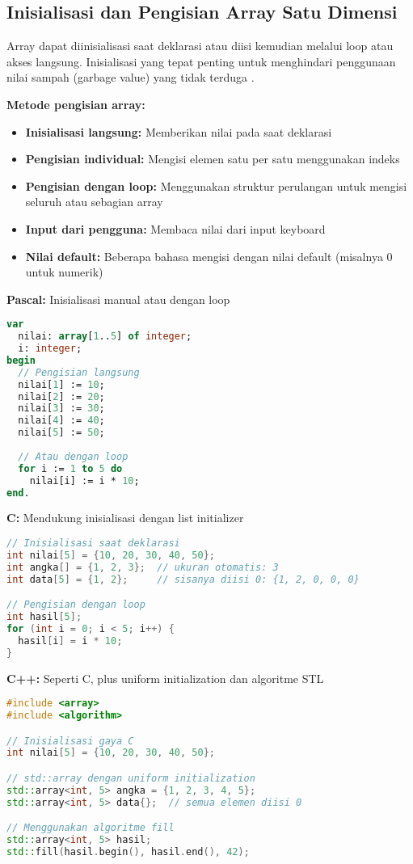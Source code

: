 \documentclass[../main.tex]{subfiles}
\begin{document}
\subsection{Inisialisasi dan Pengisian Array Satu Dimensi}
Array dapat diinisialisasi saat deklarasi atau diisi kemudian melalui loop atau akses langsung. Inisialisasi yang tepat penting untuk menghindari penggunaan nilai sampah (garbage value) yang tidak terduga \parencite{geeksforgeeks-array-init,learncpp-arrays,tambahpinter-array}.

\textbf{Metode pengisian array:}
\begin{itemize}
  \item \textbf{Inisialisasi langsung:} Memberikan nilai pada saat deklarasi
  \item \textbf{Pengisian individual:} Mengisi elemen satu per satu menggunakan indeks
  \item \textbf{Pengisian dengan loop:} Menggunakan struktur perulangan untuk mengisi seluruh atau sebagian array
  \item \textbf{Input dari pengguna:} Membaca nilai dari input keyboard
  \item \textbf{Nilai default:} Beberapa bahasa mengisi dengan nilai default (misalnya 0 untuk numerik)
\end{itemize}

\textbf{Pascal:} Inisialisasi manual atau dengan loop
\begin{lstlisting}[language=Pascal, caption={Inisialisasi array di Pascal}]
var
  nilai: array[1..5] of integer;
  i: integer;
begin
  // Pengisian langsung
  nilai[1] := 10;
  nilai[2] := 20;
  nilai[3] := 30;
  nilai[4] := 40;
  nilai[5] := 50;
  
  // Atau dengan loop
  for i := 1 to 5 do
    nilai[i] := i * 10;
end.
\end{lstlisting}

\textbf{C:} Mendukung inisialisasi dengan list initializer
\begin{lstlisting}[language=C, caption={Inisialisasi array di C}]
// Inisialisasi saat deklarasi
int nilai[5] = {10, 20, 30, 40, 50};
int angka[] = {1, 2, 3};  // ukuran otomatis: 3
int data[5] = {1, 2};     // sisanya diisi 0: {1, 2, 0, 0, 0}

// Pengisian dengan loop
int hasil[5];
for (int i = 0; i < 5; i++) {
  hasil[i] = i * 10;
}
\end{lstlisting}

\textbf{C++:} Seperti C, plus uniform initialization dan algoritme STL
\begin{lstlisting}[language=C++, caption={Inisialisasi array di C++}]
#include <array>
#include <algorithm>

// Inisialisasi gaya C
int nilai[5] = {10, 20, 30, 40, 50};

// std::array dengan uniform initialization
std::array<int, 5> angka = {1, 2, 3, 4, 5};
std::array<int, 5> data{};  // semua elemen diisi 0

// Menggunakan algoritme fill
std::array<int, 5> hasil;
std::fill(hasil.begin(), hasil.end(), 42);
\end{lstlisting}
\end{document}

